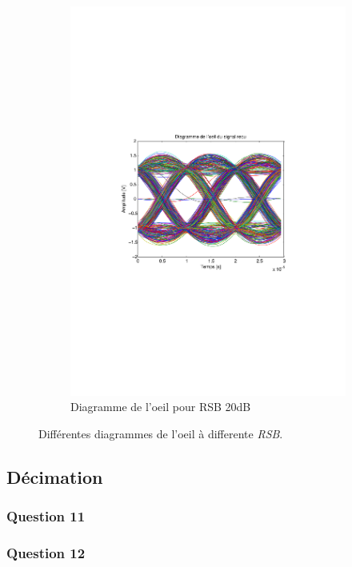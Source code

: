 \documentclass[a4paper,11pt]{article}
\begin{document}
\begin{figure}
\begin{subfigure}{.5\textwidth}
  		\includegraphics[width=1\linewidth]{Q10-EbNo20.pdf}
  		\caption{Diagramme de l'oeil pour RSB 20dB}
  		\label{fig:q10E20}
	\end{subfigure}
	\caption{Différentes diagrammes de l'oeil à differente \emph{RSB}.}
	\label{fig:q10E}
\end{figure} 



\subsection{Décimation}
\subsubsection*{Question 11}
\subsubsection*{Question 12}
\end{document}
